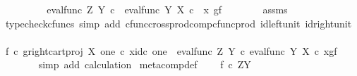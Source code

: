 \begin{isabellebody}
\ \ \ \ \isamarkupfalse%
\ \isamarkupfalse%
\ {\isachardoublequoteopen}{\isachardot}{\kern0pt}{\isachardot}{\kern0pt}{\isachardot}{\kern0pt}\ {\isacharequal}{\kern0pt}\ {\isacharparenleft}{\kern0pt}eval{\isacharunderscore}{\kern0pt}func\ Z\ Y{\isacharparenright}{\kern0pt}\ {\isasymcirc}\isactrlsub c\ \ {\isasymlangle}{\isacharparenleft}{\kern0pt}eval{\isacharunderscore}{\kern0pt}func\ Y\ X{\isacharparenright}{\kern0pt}\ {\isasymcirc}\isactrlsub c\ \ {\isasymlangle}x{\isacharcomma}{\kern0pt}\ g{\isasymrangle}{\isacharcomma}{\kern0pt}f{\isasymrangle}{\isachardoublequoteclose}\isanewline
\ \ \ \ \ \ \isamarkupfalse%
\ assms\ \isamarkupfalse%
\ {\isacharparenleft}{\kern0pt}typecheck{\isacharunderscore}{\kern0pt}cfuncs{\isacharcomma}{\kern0pt}\ simp\ add{\isacharcolon}{\kern0pt}\ cfunc{\isacharunderscore}{\kern0pt}cross{\isacharunderscore}{\kern0pt}prod{\isacharunderscore}{\kern0pt}comp{\isacharunderscore}{\kern0pt}cfunc{\isacharunderscore}{\kern0pt}prod\ id{\isacharunderscore}{\kern0pt}left{\isacharunderscore}{\kern0pt}unit{}\ id{\isacharunderscore}{\kern0pt}right{\isacharunderscore}{\kern0pt}unit{}{\isacharparenright}{\kern0pt}\isanewline
\ \ \ \ \isamarkupfalse%
\ \isamarkupfalse%
\ {\isachardoublequoteopen}{\isacharparenleft}{\kern0pt}f\isactrlsup {\isasymflat}\ {\isasymcirc}\isactrlsub c\ {\isasymlangle}g\isactrlsup {\isasymflat}{\isacharcomma}{\kern0pt}right{\isacharunderscore}{\kern0pt}cart{\isacharunderscore}{\kern0pt}proj\ X\ one{\isasymrangle}{\isacharparenright}{\kern0pt}\ {\isasymcirc}\isactrlsub c\ {\isasymlangle}x{\isacharcomma}{\kern0pt}id\isactrlsub c\ one{\isasymrangle}\ {\isacharequal}{\kern0pt}\ eval{\isacharunderscore}{\kern0pt}func\ Z\ Y\ {\isasymcirc}\isactrlsub c\ {\isasymlangle}eval{\isacharunderscore}{\kern0pt}func\ Y\ X\ {\isasymcirc}\isactrlsub c\ {\isasymlangle}x{\isacharcomma}{\kern0pt}g{\isasymrangle}{\isacharcomma}{\kern0pt}f{\isasymrangle}{\isachardoublequoteclose}\isanewline
\ \ \ \ \ \ \isamarkupfalse%
\ {\isacharparenleft}{\kern0pt}simp\ add{\isacharcolon}{\kern0pt}\ calculation{\isacharparenright}{\kern0pt}\isanewline
{}\isamarkupfalse%
%
\endisatagproof
{\isafoldproof}%
%
\isadelimproof
\isanewline
%
\endisadelimproof
\isanewline
{}\isamarkupfalse%
\ meta{\isacharunderscore}{\kern0pt}comp{}{\isacharunderscore}{\kern0pt}def{}{\isacharcolon}{\kern0pt}\ \isanewline
\ \ \ {\isachardoublequoteopen}f\ {\isasymin}\isactrlsub c\ Z\isactrlbsup Y\isactrlesup {\isachardoublequoteclose}\isanewline

\end{isabellebody}
